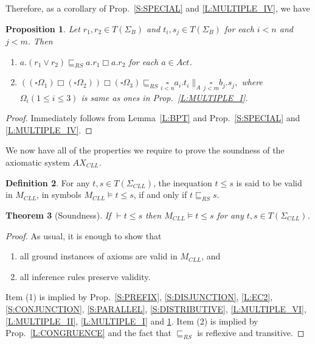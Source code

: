 \documentclass{elsarticle}
\theoremstyle{plain}
\newtheorem{theorem}{Theorem}[section]
\newtheorem{proposition}[theorem]{Proposition}
\theoremstyle{definition}
\newtheorem{mydefn}[theorem]{Definition}
\begin{document}
Therefore, as a corollary of Prop.~\ref{S:SPECIAL} and \ref{L:MULTIPLE_IV}, we have

\begin{proposition}\label{L:MULTIPLE_V}
Let $r_1,r_2\in T(\Sigma_B)$ and $t_i,s_j \in T(\Sigma_B)$ for each $i<n$ and $j<m$. Then
  \begin{enumerate}
    \item $a.(r_1 \vee r_2) \sqsubseteq_{RS} a.r_1 \Box a.r_2 $ for each $a \in Act$.
    \item $((\square \Omega_1) \Box (\square \Omega_2)) \Box (\square \Omega_3) \sqsubseteq_{RS}    \underset{i< n}{\square}a_i.t_i \parallel_A \underset{j< m}{\square}b_j.s_j,$
        where $\Omega_i(1\leq i \leq 3)$ is same as ones in Prop.~\ref{L:MULTIPLE_I}.
  \end{enumerate}
\end{proposition}
\begin{proof}
    Immediately follows from Lemma~\ref{L:BPT} and Prop.~\ref{S:SPECIAL} and \ref{L:MULTIPLE_IV}.
\end{proof}

We now have all of the properties we require to prove the soundness of the axiomatic system $AX_{CLL}$.

\begin{mydefn}
  For any $t,s\in T(\Sigma_{CLL})$, the inequation $t\leqslant s$ is said to be valid in $M_{CLL}$, in symbols $M_{CLL}\models t\leqslant s$, if and only if $t\sqsubseteq_{RS}s$.
\end{mydefn}

\begin{theorem}[Soundness]\label{T:SOUNDNESS}
If $\vdash t\leqslant s$ then $M_{CLL}\models t\leqslant s$ for any $t,s \in T(\Sigma_{CLL})$.
\end{theorem}
\begin{proof}
As usual, it is enough to show that
\begin{enumerate}
  \item all ground instances of axioms are valid in $M_{CLL}$, and
  \item all inference rules preserve validity.
\end{enumerate}
Item (1) is implied by Prop.~\ref{S:PREFIX}, \ref{S:DISJUNCTION}, \ref{L:EC2}, \ref{S:CONJUNCTION}, \ref{S:PARALLEL}, \ref{S:DISTRIBUTIVE}, \ref{L:MULTIPLE_VI}, \ref{L:MULTIPLE_II}, \ref{L:MULTIPLE_I} and \ref{L:MULTIPLE_V}.
Item (2) is implied by Prop.~\ref{L:CONGRUENCE} and the fact that $\sqsubseteq_{RS}$ is reflexive and transitive.
\end{proof}
\end{document}
